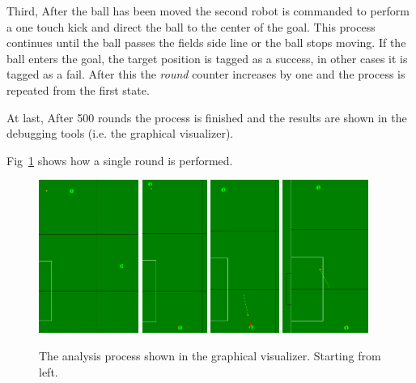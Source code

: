 \documentclass[runningheads]{llncs}
\begin{document}
Third, After the ball has been moved the second robot is commanded to perform a one touch kick and direct the ball to the center of the goal. This process continues until the ball passes the fields side line or the ball stops moving. If the ball enters the goal, the target position is tagged as a success, in other cases it is tagged as a fail. After this the \textit{round} counter increases by one and the process is repeated from the first state.

At last, After 500 rounds the process is finished and the results are shown in the debugging tools (i.e. the graphical visualizer).

Fig~\ref{fig_ANALYZE_SING_ITR} shows how a single round is performed.

\begin{figure}
\centering
\includegraphics[height=5cm]{images/Analyze_State1.png}
\includegraphics[height=5cm]{images/Analyze_State2.png}
\includegraphics[height=5cm]{images/Analyze_State3.png}
\includegraphics[height=5cm]{images/Analyze_State4.png}\caption{The analysis process shown in the graphical visualizer. Starting from left.} \label{fig_ANALYZE_SING_ITR}
\end{figure}
\end{document}
